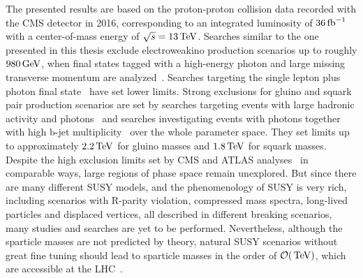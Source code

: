 The presented results are based on the proton-proton collision data recorded with the CMS detector in 2016, corresponding to an integrated luminosity of $36\mbox{\ensuremath{\,\text{fb}^\text{$-$1}}}$ with a center-of-mass energy of $\sqrt{s}=13\,\text{Te\hspace{-.08em}V}$. Searches similar to the one presented in this thesis exclude electroweakino production scenarios up to roughly $980\,\text{Ge\hspace{-.08em}V}$, when final states tagged with a high-energy photon and large missing transverse momentum are analyzed~\cite{PhotonMet}. Searches targeting the single lepton plus photon final state~\cite{PhotonLepton} have set lower limits. Strong exclusions for gluino and squark pair production scenarios are set by searches targeting events with large hadronic activity and photons~\cite{PhotonHT} and searches investigating events with photons together with high b-jet multiplicity~\cite{PhotonBJet} over the whole parameter space. They set limits up to approximately $2.2\,\text{Te\hspace{-.08em}V}$ for gluino masses and $1.8\,\text{Te\hspace{-.08em}V}$ for squark masses.\\
Despite the high exclusion limits set by CMS and ATLAS analyses~\cite{AtlasGMSB1,AtlasGMSB2,AtlasGMSB3} in comparable ways, large regions of phase space remain unexplored. But since there are many different SUSY models, and the phenomenology of SUSY is very rich, including scenarios with R-parity violation, compressed mass spectra, long-lived particles and displaced vertices, all described in different breaking scenarios, many studies and searches are yet to be performed. Nevertheless, although the sparticle masses are not predicted by theory, natural SUSY scenarios without great fine tuning should lead to sparticle masses in the order of $\mathcal{O}(\,\text{Te\hspace{-.08em}V})$, which are accessible at the LHC~\cite{SUSYNaturalStatus}.
